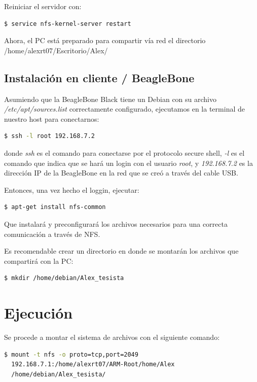 Reiniciar el servidor con: 

\begin{lstlisting}[language=bash]
$ service nfs-kernel-server restart
\end{lstlisting}

Ahora, el PC está preparado para compartir vía red el directorio /home/alexrt07/Escritorio/Alex/

\subsection{Instalación en cliente / BeagleBone}

Asumiendo que la BeagleBone Black tiene un Debian con su archivo \textit{/etc/apt/sources.list} correctamente configurado, ejecutamos en la terminal de nuestro host para conectarnos:

\begin{lstlisting}[language=bash]
$ ssh -l root 192.168.7.2
\end{lstlisting}

donde \textit{ssh} es el comando para conectarse por el protocolo secure shell, \textit{-l} es el comando que indica que se hará un login con el usuario \textit{root}, y \textit{192.168.7.2} es la dirección IP de la BeagleBone en la red que se creó a través del cable USB.

Entonces, una vez hecho el loggin, ejecutar:

\begin{lstlisting}[language=bash]
$ apt-get install nfs-common
\end{lstlisting}

Que instalará y preconfigurará los archivos necesarios para una correcta comunicación a través de NFS.

Es recomendable crear un directorio en donde se montarán los archivos que compartirá con la PC:

\begin{lstlisting}[language=bash]
$ mkdir /home/debian/Alex_tesista
\end{lstlisting}

\section{Ejecución}

Se procede a montar el sistema de archivos con el siguiente comando:

\begin{lstlisting}[language=bash]
$ mount -t nfs -o proto=tcp,port=2049 
  192.168.7.1:/home/alexrt07/ARM-Root/home/Alex 
  /home/debian/Alex_tesista/
\end{lstlisting}

